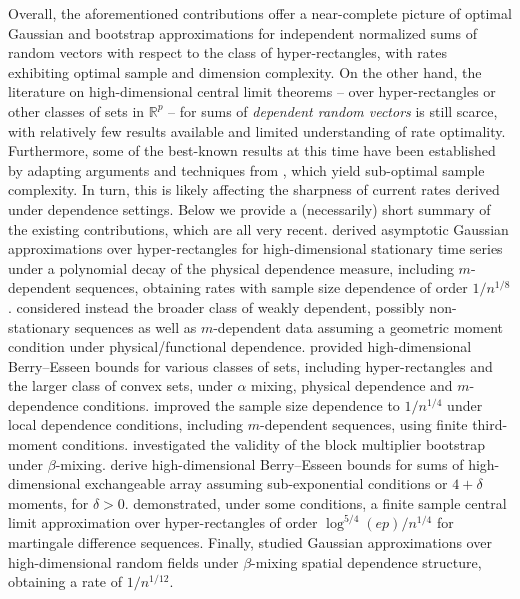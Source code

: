 \documentclass[aos]{imsart}
\begin{document}
Overall, the aforementioned contributions offer a near-complete picture of optimal Gaussian and bootstrap approximations for independent normalized sums of random vectors with respect to the class of hyper-rectangles, with rates exhibiting optimal sample and dimension complexity. %
On the other hand, the literature on high-dimensional central limit theorems -- over hyper-rectangles or other classes of sets in $\mathbb{R}^p$ -- for sums of {\it dependent random vectors} is still scarce, with relatively few results available and limited understanding of rate optimality. 
Furthermore, some of the best-known results at this time have been established by adapting arguments and techniques from \cite{chernozhukov2013gaussian, chernozhukov2017central}, which yield sub-optimal sample complexity. In turn, this is likely affecting the sharpness of current rates derived under dependence settings. Below we provide a (necessarily) short summary of the existing contributions, which are all very recent. 
\cite{zhang2017gaussian} derived asymptotic Gaussian approximations over hyper-rectangles for high-dimensional stationary time series under a polynomial decay of the physical dependence measure, including $m$-dependent sequences, obtaining rates with sample size dependence of order $1/n^{1/8}$. 
\cite{zhang2018gaussian} considered instead the broader class of weakly dependent, possibly non-stationary sequences as well as  $m$-dependent data  assuming a geometric moment condition under physical/functional dependence.  
\cite{chang2021central} provided high-dimensional Berry--Esseen bounds for various classes of sets, including hyper-rectangles and the larger class of convex sets, under $\alpha$ mixing, physical dependence and $m$-dependence conditions.   
\cite{fang2021high} improved the sample size dependence to $1/n^{1/4}$ under local dependence conditions, including $m$-dependent sequences, using finite third-moment conditions.
\cite{chernozhukov2019inference} investigated the validity of the  block multiplier bootstrap under $\beta$-mixing. 
\cite{chiang2021inference} derive high-dimensional Berry--Esseen bounds for sums of high-dimensional exchangeable array assuming sub-exponential conditions or $4 + \delta$ moments, for $\delta > 0$.
\cite{kojevnikov2022berry} demonstrated, under some conditions, a finite sample central limit approximation over hyper-rectangles of order $\log^{5/4}(ep)/n^{1/4}$ for martingale difference sequences. 
Finally, \citet{rinott1999some,kurisu2024gaussian} studied Gaussian approximations over high-dimensional random fields under $\beta$-mixing spatial dependence structure, obtaining a rate of $1/n^{1/12}$.
\end{document}
